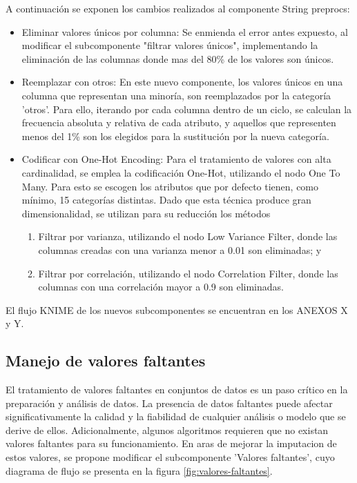 A continuación se exponen los cambios realizados al componente String preprocs:
\begin{itemize}
	\item Eliminar valores únicos por columna:  Se enmienda el error antes expuesto, al modificar el subcomponente "filtrar valores únicos", implementando la eliminación de las columnas donde mas del 80\% de los valores son únicos.
	\item Reemplazar con otros: En este nuevo componente, los valores únicos en una columna que representan una minoría, son reemplazados por la categoría 'otros'.  Para ello, iterando por cada columna dentro de un ciclo, se calculan la frecuencia absoluta y relativa de cada atributo, y aquellos que representen menos del 1\% son los elegidos para la sustitución por la nueva categoría. 
	\item Codificar con One-Hot Encoding: Para el tratamiento de valores con alta cardinalidad, se emplea la codificación One-Hot, utilizando el nodo One To Many. Para esto se escogen los atributos que por defecto tienen, como mínimo, 15 categorías distintas. Dado que esta técnica produce gran dimensionalidad, se utilizan para su reducción los métodos
	\begin{enumerate}
		\item Filtrar por varianza, utilizando el nodo Low Variance Filter, donde las columnas creadas con una varianza menor a 0.01 son eliminadas; y 
		\item Filtrar por correlación,  utilizando el nodo Correlation Filter, donde las columnas con una correlación mayor a 0.9 son eliminadas.
	\end{enumerate}
\end{itemize}

El flujo KNIME de los nuevos subcomponentes se encuentran en los ANEXOS X y Y.


\subsection{Manejo de valores faltantes}
El tratamiento de valores faltantes en conjuntos de datos es un paso crítico en la preparación y análisis de datos. La presencia de datos faltantes puede afectar significativamente la calidad y la fiabilidad de cualquier análisis o modelo que se derive de ellos. Adicionalmente, algunos algoritmos requieren que no existan valores faltantes para su funcionamiento. En aras de mejorar la imputacion de estos valores, se propone modificar el subcomponente 'Valores faltantes', cuyo diagrama de flujo se presenta en la figura \ref{fig:valores-faltantes}.

